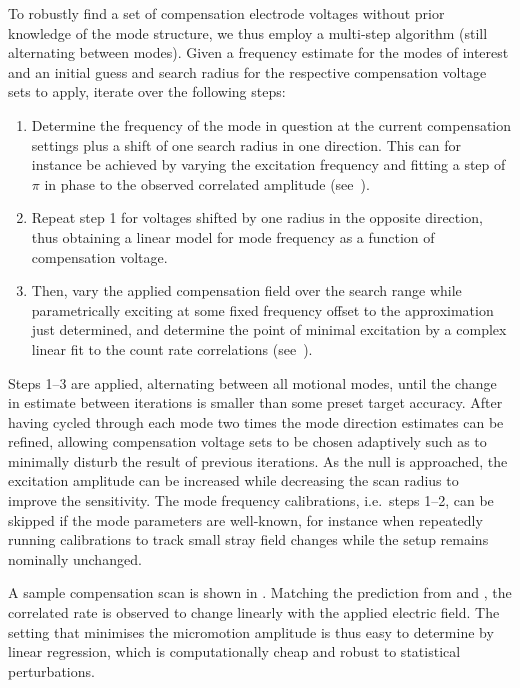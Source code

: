 \documentclass[pra,twocolumn]{revtex4-2}
\begin{document}
To robustly find a set of compensation electrode voltages without prior knowledge of the mode structure, we thus employ a multi-step algorithm (still alternating between modes).
Given a frequency estimate for the modes of interest and an initial guess and search radius for the respective compensation voltage sets to apply, iterate over the following steps:
\begin{enumerate}
	\item Determine the frequency of the mode in question at the current compensation settings plus a shift of one search radius in one direction. This can for instance be achieved by varying the excitation frequency and fitting a step of $\pi$ in phase to the observed correlated amplitude (see~).
	\item Repeat step 1 for voltages shifted by one radius in the opposite direction, thus obtaining a linear model for mode frequency as a function of compensation voltage.
	\item Then, vary the applied compensation field over the search range while parametrically exciting at some fixed frequency offset to the approximation just determined, and determine the point of minimal excitation by a complex linear fit to the count rate correlations (see~).
\end{enumerate}
Steps 1–3 are applied, alternating between all motional modes, until the change in estimate between iterations is smaller than some preset target accuracy.
After having cycled through each mode two times the mode direction estimates can be refined, allowing compensation voltage sets to be chosen adaptively such as to minimally disturb the result of previous iterations.
As the \RF{} null is approached, the excitation amplitude can be increased while decreasing the scan radius to improve the sensitivity.
The mode frequency calibrations, i.e.~steps 1–2, can be skipped if the mode parameters are well-known, for instance when repeatedly running calibrations to track small stray field changes while the setup remains nominally unchanged.

A sample compensation scan is shown in .
Matching the prediction from  and , the correlated rate is observed to change linearly with the applied electric field.
The setting that minimises the micromotion amplitude is thus easy to determine by linear regression, which is computationally cheap and robust to statistical perturbations.
\end{document}
